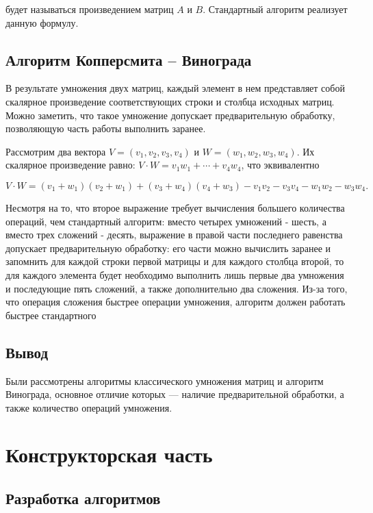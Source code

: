 будет называться произведением матриц $A$ и $B$. Стандартный алгоритм
реализует данную формулу.

\subsection{Алгоритм Копперсмита -- Винограда}

В результате умножения двух матриц, каждый элемент в нем представляет собой скалярное произведение соответствующих строки и столбца исходных матриц. Можно заметить, что такое умножение допускает предварительную обработку, позволяющую часть работы выполнить заранее.

Рассмотрим два вектора $V = (v_1, v_2, v_3, v_4)$ и $W = (w_1, w_2, w_3, w_4)$. Их скалярное произведение равно: $V \cdot W = v_1 w_1 + \cdots + v_4 w_4$, что эквивалентно

\begin{equation}
    V \cdot W = (v_1 + w_1)(v_2 + w_1) + (v_3 + w_4)(v_4 + w_3) - v_1 v_2 - v_3 v_4 - w_1 w_2 - w_3 w_4.
\end{equation}

Несмотря на то, что второе выражение требует вычисления большего количества операций, чем стандартный алгоритм: вместо четырех умножений - шесть, а вместо трех сложений - десять, выражение в правой части последнего равенства допускает предварительную обработку: его части можно вычислить заранее и запомнить для каждой строки первой матрицы и для каждого столбца второй, то для каждого элемента будет необходимо выполнить лишь первые два умножения и последующие пять сложений, а также дополнительно два сложения. Из-за того, что операция сложения быстрее операции умножения, алгоритм должен работать быстрее стандартного

\subsection{Вывод}

Были рассмотрены алгоритмы классического умножения матриц и алгоритм Винограда, основное отличие которых — наличие предварительной обработки, а также количество операций умножения.

\section{Конструкторская часть}

\subsection{Разработка алгоритмов}

